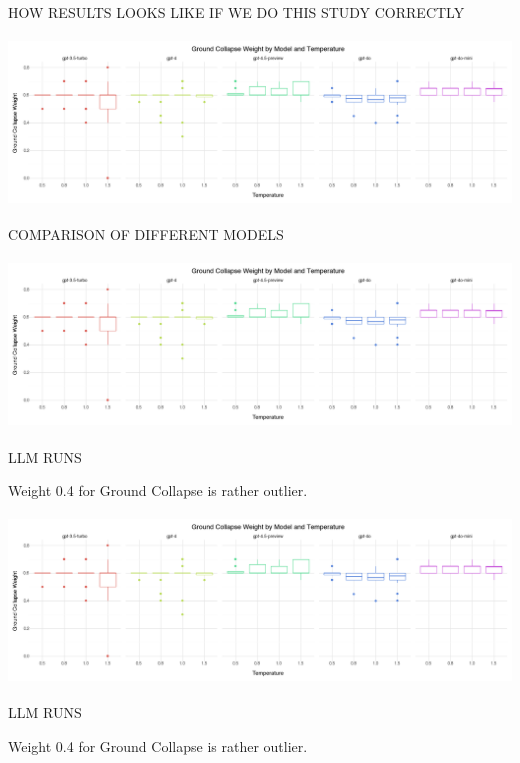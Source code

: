 \documentclass[11pt, aspectratio=169]{beamer}
\begin{document}
\begin{frame}{\MakeUppercase{How results looks like if we do this study correctly}}

    \includegraphics[width=14cm,height=4.5cm]{output/llm_ground_collapse_plot}

\end{frame}


\begin{frame}{\MakeUppercase{Comparison of different models}}

    \includegraphics[width=14cm,height=4.5cm]{output/llm_ground_collapse_plot}

\end{frame}


\begin{frame}{\MakeUppercase{LLM runs}}

    Weight 0.4 for Ground Collapse is rather outlier.

    \includegraphics[width=14cm,height=4.5cm]{output/llm_ground_collapse_plot}

\end{frame}

\begin{frame}{\MakeUppercase{LLM runs}}

    Weight 0.4 for Ground Collapse is rather outlier.

    

\end{frame}
\end{document}
